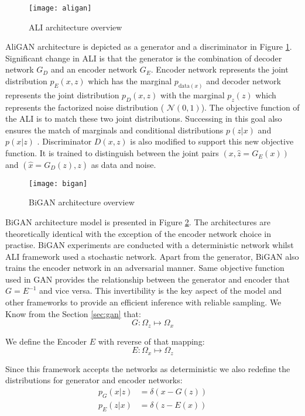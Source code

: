 \begin{figure}[h!]
	\centering
	\texttt{[image: aligan]}
    \caption{ALI architecture overview}
    \label{fig:aligan_model}
\end{figure}

AliGAN architecture is depicted as a generator and a discriminator in Figure \ref{fig:aligan_model}.
Significant change in ALI is that the generator is the combination of decoder network $G_D$ and an
encoder network $G_E$. Encoder network represents the joint distribution $p_{E}(x, z)$ which has the marginal
$p_{\text{data}(x)}$ and decoder network represents the joint distribution $p_{D}(x, z)$ with the marginal
$p_z(z)$ which represents the factorized noise distribution ( $\mathcal{N}(0, 1)$). The
objective function of the ALI is to match these two joint distributions. Successing in this goal
also ensures the match of marginals and conditional distributions $p(z | x)$ and $p(x | z)$
. Discriminator $D(x,z)$ is also modified to support this new objective function. It is trained to
distinguish between the joint pairs  $(x, \hat{z} = G_{E}(x))$ and $(\hat{x} = G_{D}(z), z)$ as data
and noise.

\begin{figure}[h!]
	\centering
	\texttt{[image: bigan]}
    \caption{BiGAN architecture overview}
    \label{fig:bigan_model}
\end{figure}


BiGAN architecture model is presented in Figure \ref{fig:bigan_model}. The architectures are
theoretically identical with the exception of the encoder network choice in practise. BiGAN
experiments are conducted with a deterministic network whilst ALI framework used a stochastic
network. Apart from the generator, BiGAN also trains the encoder network in an adversarial manner.
Same objective function used in GAN provides the relationship between the generator and encoder that
$G = E^{-1}$ and vice versa. This invertibility is the key aspect of the model and other
frameworks to provide an efficient inference with reliable sampling. We Know from the Section
\ref{sec:gan} that: 
$$
G : \Omega_{z} \mapsto \Omega_{x}
$$

We define the Encoder $E$ with reverse of that mapping:
$$
E : \Omega_{x} \mapsto \Omega_{z}
$$

Since this framework accepts the networks as deterministic we also redefine the distributions for
generator and encoder networks:
\begin{align*}
    p_G(x | z) & = \delta (x - G(z)) \\
    p_E(z | x) & = \delta (z - E(x))
\end{align*}

